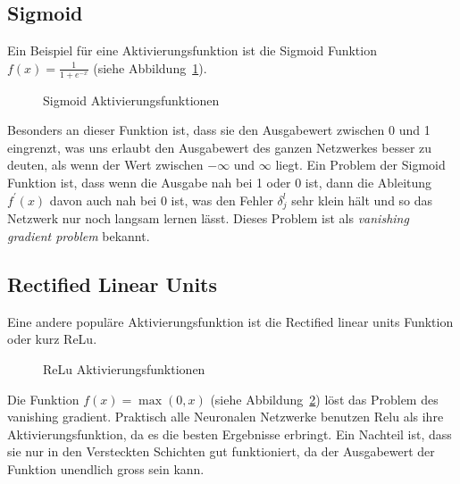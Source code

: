 \documentclass[12pt,a4paper]{report}
\begin{document}
\subsection{Sigmoid}
Ein Beispiel für eine Aktivierungsfunktion ist die Sigmoid Funktion $f(x) = \frac{1}{1 + e^{-x}}$ (siehe Abbildung~\ref{fig:activation1}).
\begin{figure}[h]
    \centering
{}
    \caption{Sigmoid Aktivierungsfunktionen}
    \label{fig:activation1}
\end{figure}
Besonders an dieser Funktion ist, dass sie den Ausgabewert zwischen 0 und 1 eingrenzt, was uns erlaubt den Ausgabewert des ganzen
Netzwerkes besser zu deuten, als wenn der Wert zwischen $-\infty$ und $\infty$ liegt.
Ein Problem der Sigmoid Funktion ist, dass wenn die Ausgabe nah bei 1 oder 0 ist, dann die Ableitung $f^\prime(x)$ davon auch nah bei 0 ist,
was den Fehler $\delta^l_j$ sehr klein hält und so das Netzwerk nur noch langsam lernen lässt.
Dieses Problem ist als \textit{vanishing gradient problem} bekannt.
\subsection{Rectified Linear Units}
Eine andere populäre Aktivierungsfunktion ist die Rectified linear units Funktion oder kurz ReLu.
\begin{figure}[h]
    \centering
{}
    \caption{ReLu Aktivierungsfunktionen}
    \label{fig:activation2}
\end{figure}
Die Funktion $f(x) = \max(0, x)$ (siehe Abbildung~\ref{fig:activation2}) löst das Problem des vanishing gradient.
Praktisch alle Neuronalen Netzwerke benutzen Relu als ihre Aktivierungsfunktion,
da es die besten Ergebnisse erbringt\cite{activations}.
Ein Nachteil ist, dass sie nur in den Versteckten Schichten gut funktioniert,
da der Ausgabewert der Funktion unendlich gross sein kann.
\end{document}
